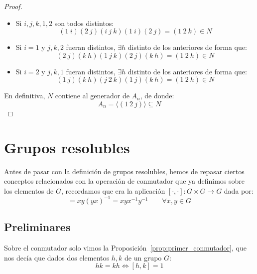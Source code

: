 \begin{teo}[de Abel]
\begin{proof}
        \begin{itemize}
            \item Si $i,j,k,1,2$ son todos distintos:
                \begin{equation*}
                    (1\ i)(2\ j)(i\ j\ k)(1\ i)(2\ j) = (1\ 2\ k) \in N
                \end{equation*}
            \item Si $i = 1$ y $j, k, 2$ fueran distintos, $\exists h$ distinto de los anteriores de forma que:
                \begin{equation*}
                    (2\ j)(k\ h)(1\ j\ k)(2\ j)(k\ h) = (1\ 2\ h) \in N
                \end{equation*}
            \item Si $i = 2$ y $j, k, 1$ fueran distintos, $\exists h$ distinto de los anteriores de forma que:
                \begin{equation*} 
                    (1\ j)(k\ h)(j\ 2\ k)(1\ j)(k\ h) = (1\ 2\ h) \in N
                \end{equation*}
        \end{itemize}
        En definitiva, $N$ contiene al generador de $A_n$, de donde:
        \begin{equation*}
            A_n = \langle (1\ 2\ j) \rangle  \subseteq N
        \end{equation*}
    \end{proof}
\end{teo}

\section{Grupos resolubles}
Antes de pasar con la definición de grupos resolubles, hemos de repasar ciertos conceptos relacionados con la operación de conmutador que ya definimos sobre los elementos de $G$, recordamos que era la aplicación $[\cdot ,\cdot ]:G\times G\to G$ dada por:
\begin{equation*}
    [x,y] = xy{(yx)}^{-1} = xyx^{-1}y^{-1} \qquad \forall x,y\in G
\end{equation*}

\subsection{Preliminares}
\noindent
Sobre el conmutador solo vimos la Proposición~\ref{prop:primer_conmutador}, que nos decía que dados dos elementos $h,k$ de un grupo $G$:
\begin{equation*}
    hk = kh \Longleftrightarrow [h,k] = 1
\end{equation*}

